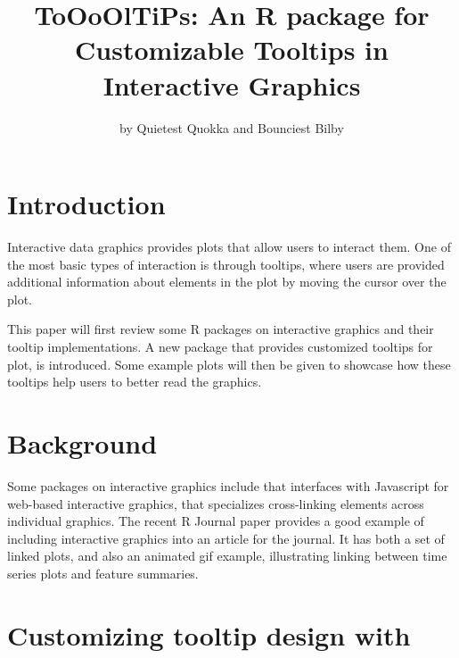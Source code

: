\title{ToOoOlTiPs: An R package for Customizable Tooltips in Interactive Graphics}


\author{by Quietest Quokka and Bounciest Bilby}

\maketitle


\section{Introduction}\label{introduction}

Interactive data graphics provides plots that allow users to interact them. One of the most basic types of interaction is through tooltips, where users are provided additional information about elements in the plot by moving the cursor over the plot.

This paper will first review some R packages on interactive graphics and their tooltip implementations. A new package  that provides customized tooltips for plot, is introduced. Some example plots will then be given to showcase how these tooltips help users to better read the graphics.

\section{Background}\label{background}

Some packages on interactive graphics include  \citep{plotly} that interfaces with Javascript for web-based interactive graphics,  \citep{crosstalk} that specializes cross-linking elements across individual graphics. The recent R Journal paper  \citep{RJ-2021-050} provides a good example of including interactive graphics into an article for the journal. It has both a set of linked plots, and also an animated gif example, illustrating linking between time series plots and feature summaries.

\section{\texorpdfstring{Customizing tooltip design with }{Customizing tooltip design with }}\label{customizing-tooltip-design-with}

